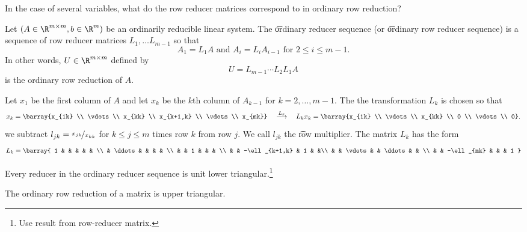 

In the case of several variables, what do the row reducer matrices correspond to in ordinary row reduction?


Let $(A \in \R^{m \times m}, b \in \R^{m})$ be an ordinarily reducible linear system.
The \t{ordinary reducer sequence} (or \t{ordinary row reducer sequence}) is a sequence of row reducer matrices $L_{1}, \dots L_{m-1}$ so that
\[
  A_1 = L_1A \text{ and } A_i = L_iA_{i-1} \text{ for } 2 \leq i \leq m-1.
\]
In other words, $U \in \R^{m \times m}$ defined by
\[
  U = L_{m-1} \cdots L_2 L_1 A
\]
is the ordinary row reduction of $A$.


Let $x_1$ be the first column of $A$ and let $x_k$ be the $k$th column of $A_{k-1}$ for $k = 2, \dots, m-1$.
The the transformation $L_k$ is chosen so that
\[
  x_k = \barray{x_{1k} \\ \vdots \\ x_{kk} \\ x_{k+1,k} \\ \vdots \\ x_{mk}} \quad \overset{L_k}{\longrightarrow} \quad L_kx_k = \barray{x_{1k} \\ \vdots \\ x_{kk} \\ 0 \\ \vdots \\ 0}.
\]
we subtract $l_{jk} = \nicefrac{x_{jk}}{x_{kk}}$ for $k \leq j \leq m$ times row $k$ from row $j$.
We call $l_{jk}$ the \t{row multiplier}.
The matrix $L_k$ has the form
\[
  L_k = \barray{
    1 & & & &  & \\
    & \ddots & & & & \\
    & & 1 & & & \\
    & & -\ell_{k+1,k} & 1 & &\\
    & & \vdots & & \ddots & & \\
    & & -\ell_{mk} & & & 1
  }
\]


\begin{proposition}
  Every reducer in the ordinary reducer sequence is unit lower triangular.\footnote{Use result from row-reducer matrix.}
\end{proposition}

\begin{proposition}
  The ordinary row reduction of a matrix is upper triangular.
\end{proposition}


\blankpage

